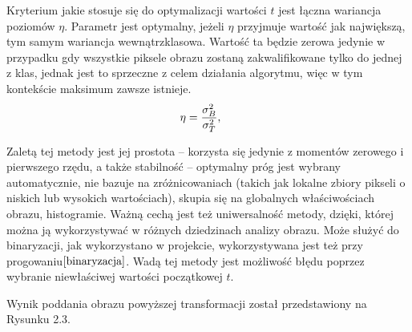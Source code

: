 \documentclass[eng,oneside]{mgr}
\begin{document}
Kryterium jakie stosuje się do optymalizacji wartości $t$ jest łączna wariancja poziomów $\eta$. Parametr jest optymalny, jeżeli $\eta$ przyjmuje wartość jak największą, tym samym wariancja wewnątrzklasowa. Wartość ta będzie zerowa jedynie w przypadku gdy wszystkie piksele obrazu zostaną zakwalifikowane tylko do jednej z klas, jednak jest to sprzeczne z celem działania algorytmu, więc w tym kontekście maksimum zawsze istnieje.
\begin{equation}
\eta=\frac{\sigma_B^2}{\sigma_T^2}, \hspace{0.5cm} 
\end{equation}
\par Zaletą tej metody jest jej prostota – korzysta się jedynie z momentów zerowego i pierwszego rzędu, a także stabilność – optymalny próg jest wybrany automatycznie, nie bazuje na zróżnicowaniach (takich jak lokalne zbiory pikseli o niskich lub wysokich wartościach), skupia się na globalnych właściwościach obrazu, histogramie. Ważną cechą jest też uniwersalność metody, dzięki, której można ją wykorzystywać w różnych dziedzinach analizy obrazu. Może służyć do binaryzacji, jak wykorzystano w projekcie, wykorzystywana jest też przy progowaniu$\cite{binaryzacja}$. Wadą tej metody jest możliwość błędu poprzez wybranie niewłaściwej wartości początkowej $t$. 
\par Wynik poddania obrazu powyższej transformacji został przedstawiony na Rysunku 2.3.
\end{document}
